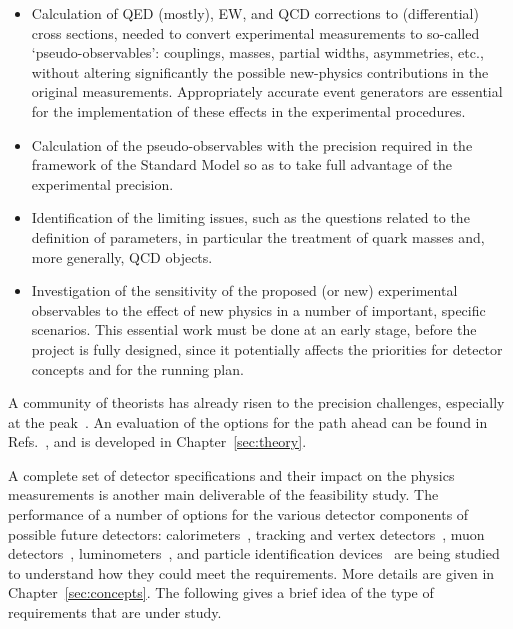 \begin{itemize}
\item  Calculation of QED (mostly), EW, and QCD corrections to (differential) cross sections, needed to convert experimental measurements to so-called `pseudo-observables': couplings, masses, partial widths, asymmetries, etc., without altering significantly the possible new-physics contributions in the original measurements.
Appropriately accurate event generators are essential for the implementation of these effects in the experimental procedures.
\item  Calculation of the pseudo-observables with the precision required in the framework of the Standard Model so as to take full advantage of the experimental precision.
\item 
Identification of the limiting issues, such as the questions related to the definition of parameters, in particular the treatment of quark masses and, more generally, QCD objects.
\item Investigation of the sensitivity of the proposed (or new) experimental observables to the effect of new physics in a number of important, specific scenarios. 
This essential work must be done at an early stage, before the project is fully designed, since it potentially affects the priorities for detector concepts and for the running plan.
\end{itemize}

A community of theorists has already risen to the precision challenges, especially at the \PZ peak~\cite{Blondel:2018mad}. 
An evaluation of the options for the path ahead can be found in Refs.~\cite{Blondel:2019qlh,Freitas:2019bre,Heinemeyer:2021rgq}, and is developed in Chapter~\ref{sec:theory}.

A complete set of detector specifications and their impact on the physics measurements is another main deliverable of the feasibility study. 
The performance of a number of options for the various detector components of possible future detectors: calorimeters~\cite{Aleksa:2021ztd}, tracking and vertex detectors~\cite{Barchetta:2021ibt}, muon detectors~\cite{Braibant:2021wts}, luminometers~\cite{Dam:2021sdj}, and particle identification devices~\cite{Wilkinson:2021ehf} are being studied to understand how they could meet the requirements. 
More details are given in Chapter~\ref{sec:concepts}. 
The following gives a brief idea of the type of requirements that are under study. 

